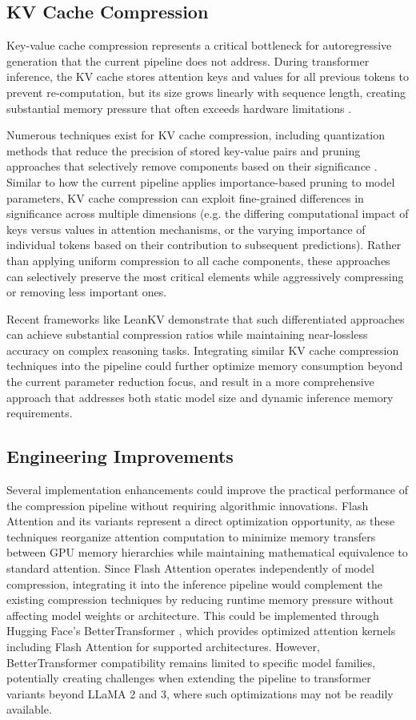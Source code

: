 \subsection{KV Cache Compression}
Key-value cache compression represents a critical bottleneck for autoregressive generation that the current pipeline does not address. During transformer inference, the KV cache stores attention keys and values for all previous tokens to prevent re-computation, but its size grows linearly with sequence length, creating substantial memory pressure that often exceeds hardware limitations \cite{kvcompr}.

Numerous techniques exist for KV cache compression, including quantization methods that reduce the precision of stored key-value pairs and pruning approaches that selectively remove components based on their significance \cite{kvcompr2}. Similar to how the current pipeline applies importance-based pruning to model parameters, KV cache compression can exploit fine-grained differences in significance across multiple dimensions (e.g. the differing computational impact of keys versus values in attention mechanisms, or the varying importance of individual tokens based on their contribution to subsequent predictions). Rather than applying uniform compression to all cache components, these approaches can selectively preserve the most critical elements while aggressively compressing or removing less important ones.

Recent frameworks like LeanKV \cite{kvcompr2} demonstrate that such differentiated approaches can achieve substantial compression ratios while maintaining near-lossless accuracy on complex reasoning tasks. Integrating similar KV cache compression techniques into the pipeline could further optimize memory consumption beyond the current parameter reduction focus, and result in a more comprehensive approach that addresses both static model size and dynamic inference memory requirements.

\subsection{Engineering Improvements}
Several implementation enhancements could improve the practical performance of the compression pipeline without requiring algorithmic innovations. Flash Attention \cite{flash_attention} and its variants represent a direct optimization opportunity, as these techniques reorganize attention computation to minimize memory transfers between GPU memory hierarchies while maintaining mathematical equivalence to standard attention. Since Flash Attention operates independently of model compression, integrating it into the inference pipeline would complement the existing compression techniques by reducing runtime memory pressure without affecting model weights or architecture. This could be implemented through Hugging Face's BetterTransformer \cite{bettertransformer}, which provides optimized attention kernels including Flash Attention for supported architectures. However, BetterTransformer compatibility remains limited to specific model families, potentially creating challenges when extending the pipeline to transformer variants beyond LLaMA 2 and 3, where such optimizations may not be readily available.

